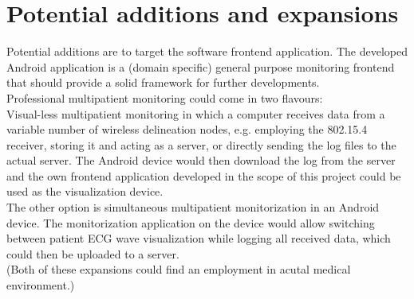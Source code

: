 	
	\section{Potential additions and expansions}
	\label{sec:end-further}

		Potential additions are to target the software frontend application. The developed Android application is a (domain specific) general purpose monitoring frontend that should provide a solid framework for further developments.\\

		Professional multipatient monitoring could come in two flavours:\\

		Visual-less multipatient monitoring in which a computer receives data from a variable number of wireless delineation nodes, e.g. employing the 802.15.4 receiver, storing it and acting as a server, or directly sending the log files to the actual server. The Android device would then download the log from the server and the own frontend application developed in the scope of this project could be used as the visualization device.\\

		The other option is simultaneous multipatient monitorization in an Android device. The monitorization application on the device would allow switching between patient ECG wave visualization while logging all received data, which could then be uploaded to a server.\\

		(Both of these expansions could find an employment in acutal medical environment.)


